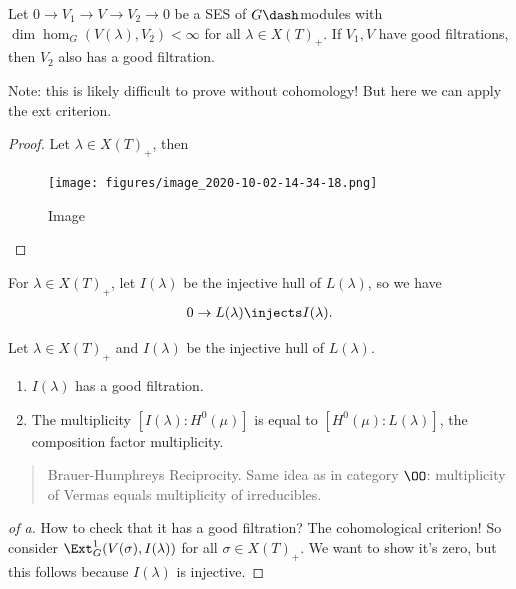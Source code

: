 \begin{corollary}[?]

Let \(0\to V_1 \to V \to V_2 \to 0\) be a SES of \(G\dash\)modules with
\(\dim \hom_G(V(\lambda), V_2) < \infty\) for all
\(\lambda \in X(T)_+\). If \(V_1, V\) have good filtrations, then
\(V_2\) also has a good filtration.

\end{corollary}

Note: this is likely difficult to prove without cohomology! But here we
can apply the ext criterion.

\begin{proof}

Let \(\lambda \in X(T)_+\), then

\begin{figure}
\centering
\texttt{[image: figures/image\_2020-10-02-14-34-18.png]}
\caption{Image}
\end{figure}

\end{proof}

For \(\lambda \in X(T)_+\), let \(I(\lambda)\) be the injective hull of
\(L(\lambda)\), so we have
\begin{align*}  
0 \to L(\lambda) \injects I(\lambda)
.\end{align*}

\begin{theorem}[?]

Let \(\lambda \in X(T)_+\) and \(I(\lambda)\) be the injective hull of
\(L(\lambda)\).

\begin{enumerate}
\def\labelenumi{\alph{enumi}.}
\item
  \(I(\lambda)\) has a good filtration.
\item
  The multiplicity \([I(\lambda): H^0(\mu)]\) is equal to
  \([H^0(\mu): L(\lambda)]\), the composition factor multiplicity.
\end{enumerate}

\begin{quote}
Brauer-Humphreys Reciprocity. Same idea as in category \(\OO\):
multiplicity of Vermas equals multiplicity of irreducibles.
\end{quote}

\end{theorem}

\begin{proof}[of a]

How to check that it has a good filtration? The cohomological criterion!
So consider \(\Ext^1_G( V(\sigma), I(\lambda) )\) for all
\(\sigma \in X(T)_+\). We want to show it's zero, but this follows
because \(I(\lambda)\) is injective.

\end{proof}

